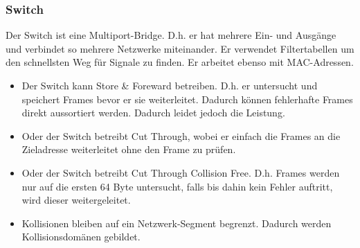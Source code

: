 \documentclass[12pt,a4paper]{article}
\begin{document}
		\subsubsection{Switch}
			Der Switch ist eine Multiport-Bridge. D.h. er hat mehrere Ein- und Ausgänge und verbindet so mehrere Netzwerke miteinander. Er verwendet Filtertabellen um den schnellsten Weg für Signale zu finden. Er arbeitet ebenso mit MAC-Adressen.
			\begin{center}
			\end{center}
			\begin{itemize}
				\item Der Switch kann Store \& Foreward betreiben. D.h. er untersucht und speichert Frames bevor er sie weiterleitet. Dadurch können fehlerhafte Frames direkt aussortiert werden. Dadurch leidet jedoch die Leistung.
				\item Oder der Switch betreibt Cut Through, wobei er einfach die Frames an die Zieladresse weiterleitet ohne den Frame zu prüfen.
				\item Oder der Switch betreibt Cut Through Collision Free. D.h. Frames werden nur auf die ersten 64 Byte untersucht, falls bis dahin kein Fehler auftritt, wird dieser weitergeleitet.
				\item Kollisionen bleiben auf ein Netzwerk-Segment begrenzt. Dadurch werden Kollisionsdomänen gebildet.
			\end{itemize}
		
\end{document}
